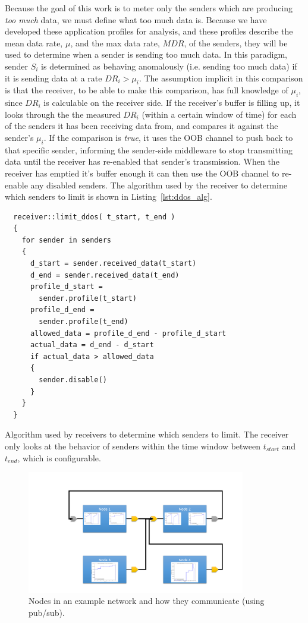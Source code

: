 Because the goal of this work is to meter only the senders which are
producing \emph{too much} data, we must define what too much data is.
Because we have developed these application profiles for analysis, and
these profiles describe the mean data rate, $\mu$, and the max data
rate, $MDR$, of the senders, they will be used to determine when a
sender is sending too much data.  In this paradigm, sender $S_i$ is
determined as behaving anomalously (i.e. sending too much data) if it
is sending data at a rate $DR_i > \mu_i$.  The assumption implicit in
this comparison is that the receiver, to be able to make this
comparison, has full knowledge of $\mu_i$, since $DR_i$ is calculable
on the receiver side.  If the receiver's buffer is filling up, it
looks through the the measured $DR_i$ (within a certain window of
time) for each of the senders it has been receiving data from, and
compares it against the sender's $\mu_i$.  If the comparison is
\emph{true}, it uses the OOB channel to push back to that specific
sender, informing the sender-side middleware to stop transmitting data
until the receiver has re-enabled that sender's transmission.  When
the receiver has emptied it's buffer enough it can then use the OOB
channel to re-enable any disabled senders.  The algorithm used by the
receiver to determine which senders to limit is shown in
Listing~\ref{lst:ddos_alg}.

\begin{listing}[ht!]
  \begin{verbatim}
  receiver::limit_ddos( t_start, t_end )
  {
    for sender in senders
    {
      d_start = sender.received_data(t_start)
      d_end = sender.received_data(t_end)
      profile_d_start =
        sender.profile(t_start)
      profile_d_end =
        sender.profile(t_end)
      allowed_data = profile_d_end - profile_d_start
      actual_data = d_end - d_start
      if actual_data > allowed_data
      {
        sender.disable()
      }
    }
  }
  \end{verbatim}
  \caption{Algorithm used by receivers to determine which senders to
    limit.  The receiver only looks at the behavior of senders within
    the time window between $t_{start}$ and $t_{end}$, which is
    configurable.}
  \label{lst:ddos_alg}
\end{listing}


\begin{figure}[ht!]
  \centering
  \includegraphics[width=0.85\textwidth]{../doc/src/images/results/example_setup.png}
  \caption{Nodes in an example network and how they communicate (using
    pub/sub).}
  \label{fig:ddos}
\end{figure}

